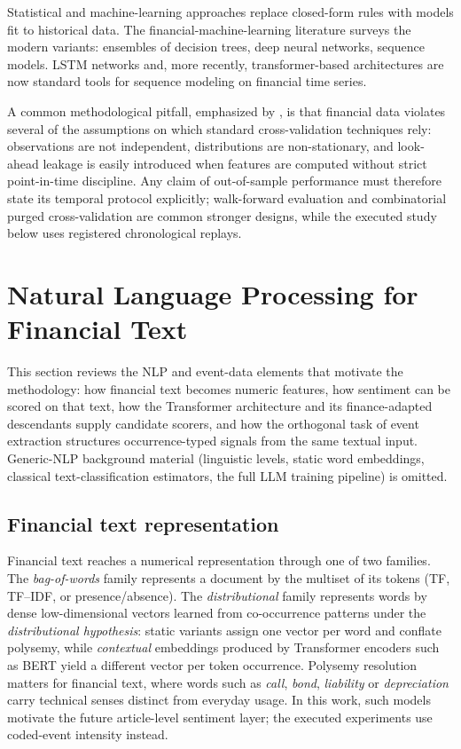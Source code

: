 Statistical and machine-learning approaches replace closed-form rules with models fit to historical data. The financial-machine-learning literature \cite{lopezdeprado2018advances,lopezdeprado2020machine} surveys the modern variants: ensembles of decision trees, deep neural networks, sequence models. LSTM networks and, more recently, transformer-based architectures \cite{vaswani2017attention} are now standard tools for sequence modeling on financial time series.

A common methodological pitfall, emphasized by , is that financial data violates several of the assumptions on which standard cross-validation techniques rely: observations are not independent, distributions are non-stationary, and look-ahead leakage is easily introduced when features are computed without strict point-in-time discipline. Any claim of out-of-sample performance must therefore state its temporal protocol explicitly; walk-forward evaluation and combinatorial purged cross-validation are common stronger designs, while the executed study below uses registered chronological replays.

\section{Natural Language Processing for Financial Text} \label{sec:nlp-sentiment}

This section reviews the NLP and event-data elements that motivate the methodology: how financial text becomes numeric features, how sentiment can be scored on that text, how the Transformer architecture and its finance-adapted descendants supply candidate scorers, and how the orthogonal task of event extraction structures occurrence-typed signals from the same textual input. Generic-NLP background material (linguistic levels, static word embeddings, classical text-classification estimators, the full LLM training pipeline) is omitted.

\subsection{Financial text representation} \label{subsec:fin-text-repr}

Financial text reaches a numerical representation through one of two families. The \textit{bag-of-words} family represents a document by the multiset of its tokens (TF, TF--IDF, or presence/absence). The \textit{distributional} family represents words by dense low-dimensional vectors learned from co-occurrence patterns under the \textit{distributional hypothesis}: static variants assign one vector per word and conflate polysemy, while \textit{contextual} embeddings produced by Transformer encoders such as BERT \cite{devlin2019bert} yield a different vector per token occurrence. Polysemy resolution matters for financial text, where words such as \textit{call}, \textit{bond}, \textit{liability} or \textit{depreciation} carry technical senses distinct from everyday usage. In this work, such models motivate the future article-level sentiment layer; the executed experiments use coded-event intensity instead.

